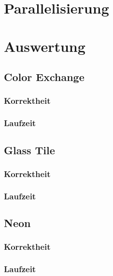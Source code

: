 \documentclass[10pt,a4paper,draft]{article}
\begin{document}
\section{Parallelisierung}


\section{Auswertung}
\subsection{Color Exchange}
\subsubsection{Korrektheit}
\subsubsection{Laufzeit}

\subsection{Glass Tile}
\subsubsection{Korrektheit}
\subsubsection{Laufzeit}

\subsection{Neon}
\subsubsection{Korrektheit}
\subsubsection{Laufzeit}
\end{document}
